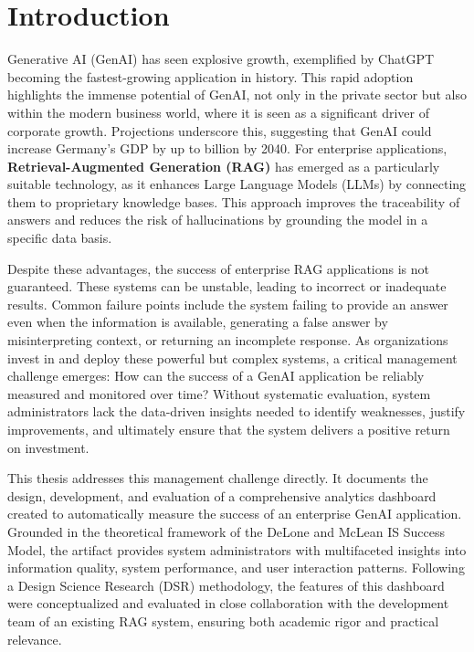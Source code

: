 \documentclass[
	english,
	ruledheaders=section,%
	class=report,%
	thesis={type=bachelor},%
	accentcolor=1b,%
	custommargins=true,%
	marginpar=false,%
	parskip=half-,%
	fontsize=11pt,%
	DIV=14,
]{tudapub}
\begin{document}

\onehalfspacing
\setcounter{seitenzahlroemisch}{\value{page}}

\chapter{Introduction}
Generative AI (GenAI) has seen explosive growth, exemplified by ChatGPT becoming the fastest-growing application in history. This rapid adoption highlights the immense potential of GenAI, not only in the private sector but also within the modern business world, where it is seen as a significant driver of corporate growth. Projections underscore this, suggesting that GenAI could increase Germany's GDP by up to  billion by 2040. For enterprise applications, \textbf{Retrieval-Augmented Generation (RAG)} has emerged as a particularly suitable technology, as it enhances Large Language Models (LLMs) by connecting them to proprietary knowledge bases. This approach improves the traceability of answers and reduces the risk of hallucinations by grounding the model in a specific data basis.

Despite these advantages, the success of enterprise RAG applications is not guaranteed. These systems can be unstable, leading to incorrect or inadequate results. Common failure points include the system failing to provide an answer even when the information is available, generating a false answer by misinterpreting context, or returning an incomplete response. As organizations invest in and deploy these powerful but complex systems, a critical management challenge emerges: How can the success of a GenAI application be reliably measured and monitored over time? Without systematic evaluation, system administrators lack the data-driven insights needed to identify weaknesses, justify improvements, and ultimately ensure that the system delivers a positive return on investment.

This thesis addresses this management challenge directly. It documents the design, development, and evaluation of a comprehensive analytics dashboard created to automatically measure the success of an enterprise GenAI application. Grounded in the theoretical framework of the DeLone and McLean IS Success Model, the artifact provides system administrators with multifaceted insights into information quality, system performance, and user interaction patterns. Following a Design Science Research (DSR) methodology, the features of this dashboard were conceptualized and evaluated in close collaboration with the development team of an existing RAG system, ensuring both academic rigor and practical relevance.
\end{document}
